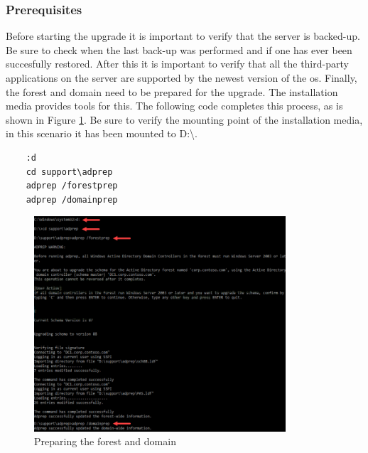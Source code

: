 \subsubsection{Prerequisites}
Before starting the upgrade it is important to verify that the server is backed-up. Be sure to check when the last back-up was performed and if one has ever been succesfully restored. After this it is important to verify that all the third-party applications on the server are supported by the newest version of the \acrshort{os}. Finally, the forest and domain need to be prepared for the upgrade. The installation media provides tools for this. The following code completes this process, as is shown in Figure \ref{fig:inplace1}. Be sure to verify the mounting point of the installation media, in this scenario it has been mounted to D:\textbackslash .

\begin{lstlisting}
	:d
	cd support\adprep
	adprep /forestprep
	adprep /domainprep
\end{lstlisting}
\begin{figure}[h]
	\includegraphics[height=8cm]{img/In-Place_WS_1.png}
	\captionsetup{width=0.8\linewidth}
	\centering		
	\caption{Preparing the forest and domain}
	\label{fig:inplace1}
\end{figure}

